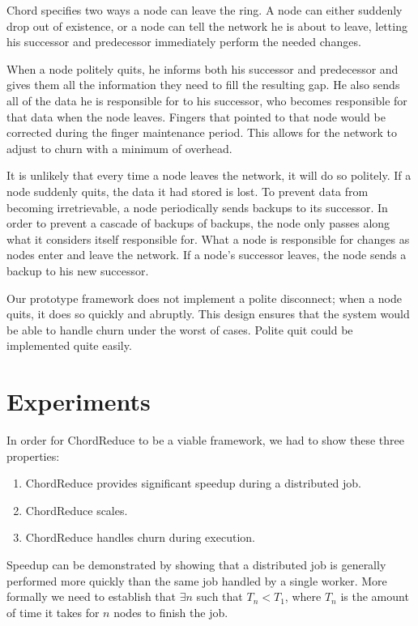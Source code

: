\documentclass[10pt, conference, compsocconf]{IEEEtran}
\begin{document}
Chord specifies two ways a node can leave the ring.  A node can either suddenly drop out of existence, or a node can tell the network he is about to leave, letting his successor and predecessor immediately perform the needed changes.

When a node politely quits, he informs both his successor and predecessor and gives them all the information they need to fill the resulting gap. He also sends all of the data he is responsible for to his successor, who becomes responsible for that data when the node leaves.  Fingers that pointed to that node would be corrected during the finger maintenance period.  This allows for the network to adjust to churn with a minimum of overhead.

It is unlikely that every time a node leaves the network, it will do so politely.  If a node suddenly quits, the data it had stored is lost. To prevent data from becoming irretrievable, a node periodically sends backups to its successor.  In order to prevent a cascade of backups of backups, the node only passes along what it considers itself responsible for.  What a node is responsible for changes as nodes enter and leave the network.  If a node's successor leaves, the node sends a backup to his new successor. 

Our prototype framework does not implement a polite disconnect;  when a node quits, it does so quickly and abruptly.  This design ensures that the  system would be able to handle churn under the worst of cases.  Polite quit could be implemented quite easily.



\section{Experiments}

In order for ChordReduce to be a viable framework, we had to show these three properties:
\begin{enumerate}
    \item ChordReduce provides significant speedup during a distributed job.
    \item ChordReduce scales.
    \item ChordReduce handles churn during execution.
\end{enumerate}
Speedup can be demonstrated by showing that a distributed job is generally performed more quickly than the same job handled by a single worker.  More formally we need to establish that $\exists n$ such that $T_{n} < T_{1}$, where $T_{n}$ is the amount of time it takes for $n$ nodes to finish the job.
\end{document}

